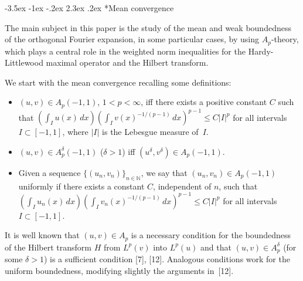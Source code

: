 \documentclass[11pt,a4paper]{article}
\makeatletter
\newcommand{\N}{\mathbb{N}}
\renewcommand\section{\@startsection {section}{1}{\z@}%
                                   {-3.5ex \@plus -1ex \@minus -.2ex}%
                                   {2.3ex \@plus.2ex}%
                                   {\centering \normalfont\large\bfseries}}
\theoremstyle{plain}
\theoremstyle{definition}
\theoremstyle{remark}
\makeatother
\begin{document}
\section*{Mean convergence}

The main subject in this paper is the study of the mean and weak 
boundedness of the orthogonal Fourier expansion, in some particular 
cases, by using $A_{p}$-theory, which plays a central role in the 
weighted norm inequalities for the Hardy-Littlewood maximal operator 
and the Hilbert transform.

We start with the mean convergence recalling some definitions:
\begin{itemize}
\item[(i)] $(u,v) \in A_{p}(-1,1)$, $1 < p < \infty$, iff there 
exists a positive constant $C$ such that
$\displaystyle \left( \int_{I} u(x)\,dx \right)
\left( \int_{I} v(x)^{-1/(p-1)}\,dx \right)^{p-1} \leq C|I|^{p}$
for all intervals $I \subset [-1,1]$, where $|I|$ is the 
Lebesgue measure of~$I$.

\item[(ii)] $(u,v) \in A_{p}^{\delta}(-1,1)$ ($\delta > 1$)
iff $(u^{\delta},v^{\delta}) \in A_{p}(-1,1)$.

\item[(iii)] \sloppy Given a sequence $\{(u_{n},v_{n})\}_{n\in\N}$, we say that 
$(u_{n},v_{n}) \in A_{p}(-1,1)$ uniformly if there exists a constant 
$C$, independent of $n$, such that
$\displaystyle \left( \int_{I} u_{n}(x)\,dx \right)
\left( \int_{I} v_{n}(x)^{-1/(p-1)}\,dx \right)^{p-1} \leq C|I|^{p}$ 
for all intervals $I \subset [-1,1]$.
\end{itemize}

It is well known that $(u,v) \in A_{p}$ is a necessary condition 
for the boundedness of the Hilbert transform $H$ from $L^{p}(v)$ into 
$L^{p}(u)$ and that $(u,v) \in A_{p}^{\delta}$ (for some 
$\delta > 1$) is a sufficient condition [7], [12]. Analogous 
conditions work for the uniform boundedness, modifying slightly 
the arguments in~[12].
\end{document}
